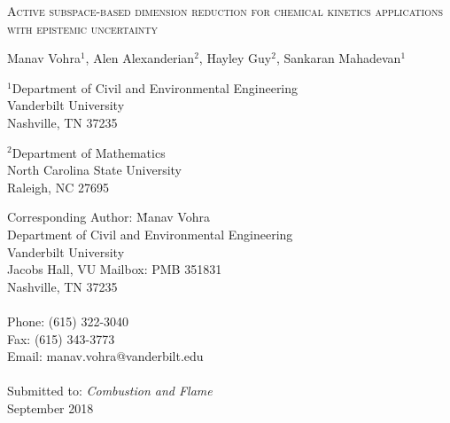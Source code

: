 \begin{center}
\textsc{Active subspace-based dimension reduction for chemical kinetics applications with epistemic uncertainty}

\bigskip 
\bigskip 

Manav Vohra$^{1}$, Alen Alexanderian$^{2}$, Hayley Guy$^{2}$, Sankaran Mahadevan$^{1}$

\bigskip
\bigskip

\normalsize
$^1$Department of Civil and Environmental Engineering\\
Vanderbilt University\\
Nashville, TN 37235\\

\bigskip

$^2$Department of Mathematics\\
North Carolina State University\\
Raleigh, NC 27695\\

\bigskip

\end{center}

\vspace{6cm}

\begin{tabbing}
Corresponding Author: \hspace{5mm} \= Manav Vohra\\
       \>  Department of Civil and Environmental Engineering\\
       \>  Vanderbilt University\\
        Jacobs Hall, VU Mailbox: PMB 351831 \\
       \>  Nashville, TN 37235 \\
       \> \\
Phone: \> (615) 322-3040 \\
Fax:   \> (615) 343-3773 \\
Email: \>  manav.vohra@vanderbilt.edu   \\
\\
Submitted to: \> \textit{Combustion and Flame} \\
\>  September 2018\\

\bigskip
\end{tabbing}

\clearpage

